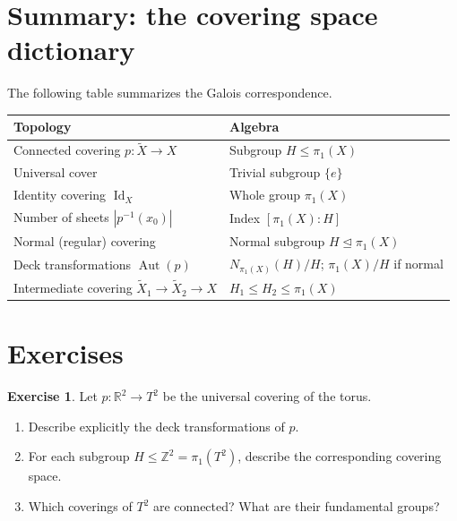 \documentclass[12pt,a4paper,openany]{book}
\theoremstyle{definition}
\newtheorem{exercise}{Exercise}[chapter]
\theoremstyle{plain}
\theoremstyle{remark}
\newcommand{\Z}{\mathbb{Z}}
\newcommand{\R}{\mathbb{R}}
\DeclareMathOperator{\Aut}{Aut}
\DeclareMathOperator{\Id}{Id}
\newcommand{\abs}[1]{\left|#1\right|}
\begin{document}
\section{Summary: the covering space dictionary}\label{sec:dictionary}

The following table summarizes the Galois correspondence.

\begin{center}
\renewcommand{\arraystretch}{1.4}
\begin{tabular}{@{}ll@{}}
  \toprule
  \textbf{Topology} & \textbf{Algebra} \\
  \midrule
  Connected covering $p\colon \widetilde{X} \to X$ &
    Subgroup $H \leq \pi_1(X)$ \\
  Universal cover &
    Trivial subgroup $\{e\}$ \\
  Identity covering $\Id_X$ &
    Whole group $\pi_1(X)$ \\
  Number of sheets $\abs{p^{-1}(x_0)}$ &
    Index $[\pi_1(X) : H]$ \\
  Normal (regular) covering &
    Normal subgroup $H \trianglelefteq \pi_1(X)$ \\
  Deck transformations $\Aut(p)$ &
    $N_{\pi_1(X)}(H)/H$; \; $\pi_1(X)/H$ if normal \\
  Intermediate covering $\widetilde{X}_1 \to \widetilde{X}_2 \to X$ &
    $H_1 \leq H_2 \leq \pi_1(X)$ \\
  \bottomrule
\end{tabular}
\end{center}

\section{Exercises}\label{sec:covering-exercises}

\begin{exercise}\label{exo:cov-R2-torus}
  Let $p\colon \R^2 \to T^2$ be the universal covering of the torus.
  \begin{enumerate}[label=(\alph*)]
    \item Describe explicitly the deck transformations of $p$.
    \item For each subgroup $H \leq \Z^2 = \pi_1(T^2)$, describe the
      corresponding covering space.
    \item Which coverings of $T^2$ are connected? What are their fundamental
      groups?
  \end{enumerate}
\end{exercise}
\end{document}
